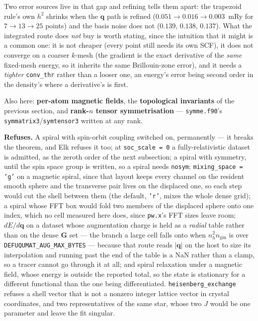 \documentclass[11pt,a4paper]{article}
\newcommand{\code}[1]{\texttt{\small #1}}
\begin{document}
Two error sources live in that gap and refining tells them apart: the trapezoid
rule's own $h^2$ shrinks when the $\mathbf q$ path is refined ($0.051 \to 0.016
\to 0.003$~mRy for $7 \to 13 \to 25$ points) and the basis noise does not
($0.139$, $0.138$, $0.137$). What the integrated route does \emph{not} buy is
worth stating, since the intuition that it might is a common one: it is not
cheaper (every point still needs its own SCF), it does not converge on a coarser
$k$-mesh (the gradient is the exact derivative of the \emph{same} fixed-mesh
energy, so it inherits the same Brillouin-zone error), and it needs a
\emph{tighter} \code{conv\_thr} rather than a looser one, an energy's error
being second order in the density's where a derivative's is first.

Also here: \textbf{per-atom magnetic fields}, the \textbf{topological
invariants} of the previous section, and \textbf{rank-$n$ tensor
symmetrisation} --- \code{symme.f90}'s \code{symmatrix3}/\code{symtensor3}
written at any rank.

\begin{refuses}
\textbf{Refuses.} A spiral with spin-orbit coupling switched on, permanently
--- it breaks the theorem, and Elk refuses it too; at \code{soc\_scale = 0} a
fully-relativistic dataset is admitted, as the zeroth order of the next
subsection; a spiral with symmetry, until the spin
space group is written, so a spiral needs \code{nosym};
\code{mixing\_space = 'g'} on a magnetic spiral, since that layout keeps every
channel on the resident smooth sphere and the transverse pair lives on the
displaced one, so each step would cut the shell between them (the default,
\code{'r'}, mixes the whole dense grid); a spiral whose FFT box would fold two
members of the displaced sphere onto one index, which no cell measured here
does, since \code{pw.x}'s FFT sizes leave room; $dE/d\mathbf q$ on a
dataset whose augmentation charge is held as a \emph{radial} table rather than
on the dense $\mathbf G$ set --- the branch a large cell falls onto when
$n_h^2 n_{\mathrm{gm}}$ is over \code{DEFUQUMAT\_AUG\_MAX\_BYTES} --- because that
route reads $|\mathbf q|$ on the host to size its interpolation and running past
the end of the table is a NaN rather than a clamp, so a tracer cannot go through
it at all; and spiral relaxation under a magnetic field, whose energy is outside
the reported total, so the state is stationary for a different functional than
the one being differentiated. \code{heisenberg\_exchange} refuses a shell
vector that is not a nonzero integer lattice vector in crystal coordinates, and
two representatives of the same star, whose two $J$ would be one parameter and
leave the fit singular.
\end{refuses}
\end{document}
